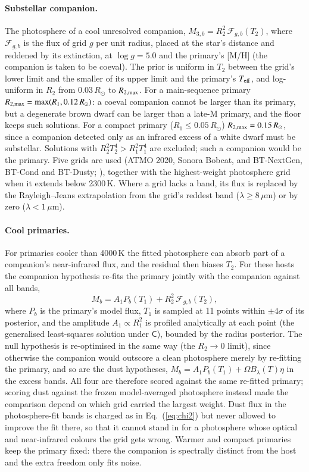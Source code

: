 \documentclass{aa}
\newcommand{\Rsun}{R_\odot}
\begin{document}
\paragraph{Substellar companion.} The photosphere of a cool unresolved companion,
$M_{3,b} = R_2^2\,\mathcal{F}_{g,b}(T_2)$, where $\mathcal{F}_{g,b}$ is the flux of
grid $g$ per unit radius, placed at the star's distance and reddened by its
extinction, at $\log g = 5.0$ and the primary's [M/H] (the companion is taken to be
coeval). The prior is uniform in $T_2$ between the grid's lower limit and the
smaller of its upper limit and the primary's $T_{\rm eff}$, and log-uniform in
$R_2$ from $0.03\,\Rsun$ to $R_{2,\rm max}$. For a main-sequence primary
$R_{2,\rm max} = \max(R_1, 0.12\,\Rsun)$: a coeval companion cannot be larger than
its primary, but a degenerate brown dwarf can be larger than a late-M primary, and
the floor keeps such solutions. For a compact primary ($R_1 \le 0.05\,\Rsun$)
$R_{2,\rm max} = 0.15\,\Rsun$, since a companion detected only as an infrared excess
of a white dwarf must be substellar. Solutions with $R_2^2 T_2^4 > R_1^2 T_1^4$
are excluded; such a companion would be the primary. Five grids are used
(ATMO 2020, Sonora Bobcat, and BT-NextGen, BT-Cond and BT-Dusty;
\citealt{phillips2020,marley2021,allard2012}), together with the highest-weight
photosphere grid when it extends below 2300\,K. Where a grid lacks a band, its
flux is replaced by the Rayleigh--Jeans extrapolation from the grid's reddest
band ($\lambda \ge 8\,\mu$m) or by zero ($\lambda < 1\,\mu$m).

\paragraph{Cool primaries.} For primaries cooler than 4000\,K the fitted
photosphere can absorb part of a companion's near-infrared flux, and the residual
then biases $T_2$. For these hosts the companion hypothesis re-fits the primary
jointly with the companion against all bands,
\begin{equation}
  M_b = A_1 P_b(T_1) + R_2^2\,\mathcal{F}_{g,b}(T_2),
\end{equation}
where $P_b$ is the primary's model flux, $T_1$ is sampled at 11 points within
$\pm4\sigma$ of its posterior, and the amplitude $A_1 \propto R_1^2$ is profiled
analytically at each point (the generalised least-squares solution under
$\mathsf{C}$), bounded by the radius posterior. The null hypothesis
is re-optimised in the same way (the $R_2 \to 0$ limit), since otherwise the
companion would outscore a clean photosphere merely by re-fitting the primary,
and so are the dust hypotheses, $M_b = A_1 P_b(T_1) + \Omega B_\lambda(T)\eta$ in
the excess bands. All four are therefore scored against the same re-fitted
primary; scoring dust against the frozen model-averaged photosphere instead made
the comparison depend on which grid carried the largest weight. Dust flux in the
photosphere-fit bands is charged as in Eq.~(\ref{eq:chi2}) but never allowed to
improve the fit there, so that it cannot stand in for a photosphere whose optical
and near-infrared colours the grid gets wrong. Warmer and compact primaries keep
the primary fixed: there the companion is spectrally distinct from the host and
the extra freedom only fits noise.
\end{document}
